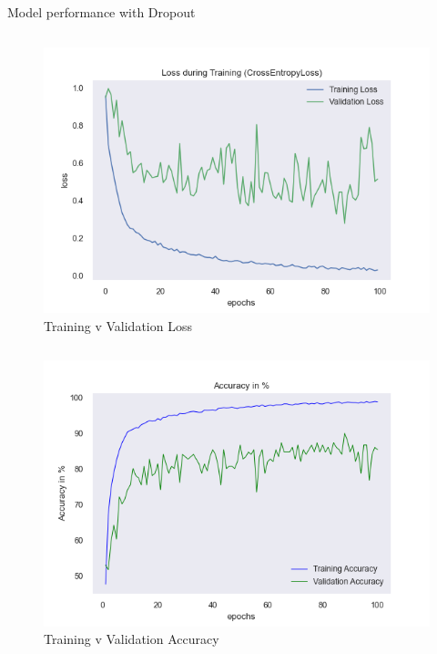 \documentclass[aspectratio=169]{beamer}
\begin{document}
{    
    \begin{frame}{Model performance with Dropout}
        \begin{column}{.5\textwidth}
            \begin{figure}
                \centering
                \includegraphics[width=1\textwidth]{img/baptiste_100epoches_val_loss__Dropouts_True__BatchNorm_False.png}
                \caption{Training v Validation Loss}
            \end{figure}
        \end{column}
        \begin{column}{.5\textwidth}
            \begin{figure}
                \centering
                \includegraphics[width=1\textwidth]{img/baptiste_100epoches_train_accuracy__Dropouts_True__BatchNorm_False.png}
                \caption{Training v Validation Accuracy}
            \end{figure}
        \end{column}
    \end{frame}


}
\end{document}
